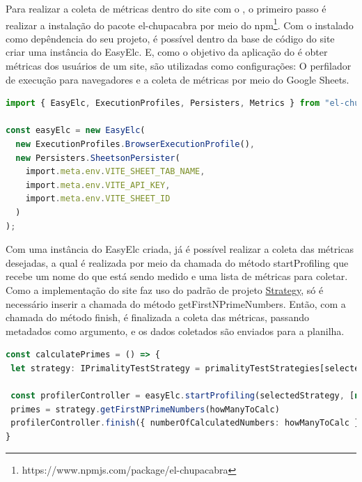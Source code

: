 \documentclass[12pt]{tcc}
\begin{document}
Para realizar a coleta de métricas dentro do site com o , o primeiro passo é realizar a instalação do pacote el-chupacabra por meio do npm\footnote{https://www.npmjs.com/package/el-chupacabra}.
Com o  instalado como depêndencia do seu projeto, é possível dentro da base de código do site criar uma instância do EasyElc.
E, como o objetivo da aplicação do  é obter métricas dos usuários de um site, são utilizadas como configurações: O perfilador de execução para navegadores e a coleta de métricas por meio do Google Sheets.


\begin{lstlisting}[label={lst:easyelc_setup}, caption={Instância do módulo EasyElc no site Calculadora dos Primeiros n Números Primos.}, language=TypeScript, breaklines=true]
import { EasyElc, ExecutionProfiles, Persisters, Metrics } from "el-chupacabra"

const easyElc = new EasyElc(
  new ExecutionProfiles.BrowserExecutionProfile(),
  new Persisters.SheetsonPersister(
    import.meta.env.VITE_SHEET_TAB_NAME,
    import.meta.env.VITE_API_KEY,
    import.meta.env.VITE_SHEET_ID
  )
);
\end{lstlisting}

Com uma instância do EasyElc criada, já é possível realizar a coleta das métricas desejadas, a qual é realizada por meio da chamada do método startProfiling que recebe um nome do que está sendo medido e uma lista de métricas para coletar.
Como a implementação do site faz uso do padrão de projeto \hyperref[subsection:strategy]{Strategy}, só é necessário inserir a chamada do método getFirstNPrimeNumbers.
Então, com a chamada do método finish, é finalizada a coleta das métricas, passando metadados como argumento, e os dados coletados são enviados para a planilha.

\begin{lstlisting}[label={lst:easyelc_usage_firstnprimes}, caption={Coleta de métricas usando o EasyElc no site Calculadora dos Primeiros n Números Primos.}, language=TypeScript, breaklines=true]
const calculatePrimes = () => {
 let strategy: IPrimalityTestStrategy = primalityTestStrategies[selectedStrategy]

 const profilerController = easyElc.startProfiling(selectedStrategy, [new Metrics.DeltaTimeMetric()])
 primes = strategy.getFirstNPrimeNumbers(howManyToCalc)
 profilerController.finish({ numberOfCalculatedNumbers: howManyToCalc })
}
\end{lstlisting}
\end{document}

